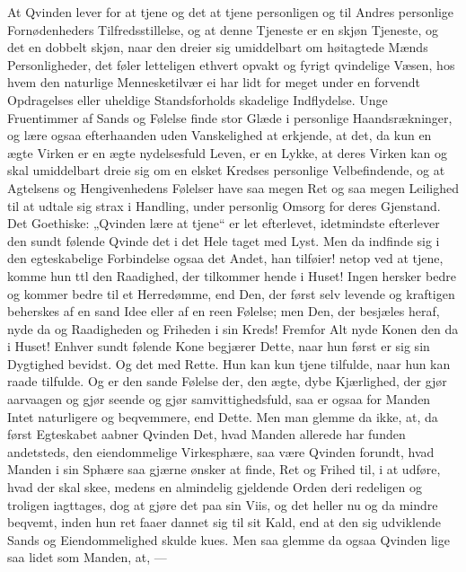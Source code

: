 \documentclass[12pt,a4paper]{book}
\newcommand{\apage}[1]{\marginnote{\footnotesize\textit{[#1]}}}
\begin{document}
At Qvinden lever for at tjene og det at tjene personligen og til Andres
personlige Fornødenheders Tilfredsstillelse, og at denne Tjeneste er en
skjøn Tjeneste, og det en dobbelt skjøn, naar den dreier sig umiddelbart \apage{107}
om høitagtede Mænds Personligheder, det føler letteligen ethvert opvakt
og fyrigt qvindelige Væsen, hos hvem den naturlige Mennesketilvær ei har
lidt for meget under en forvendt Opdragelses eller uheldige
Standsforholds skadelige Indflydelse. Unge Fruentimmer af Sands og
Følelse finde stor Glæde i personlige Haandsrækninger, og lære ogsaa
efterhaanden uden Vanskelighed at erkjende, at det, da kun en ægte
Virken er en ægte nydelsesfuld Leven, er en Lykke, at deres Virken kan
og skal umiddelbart dreie sig om en elsket Kredses personlige
Velbefindende, og at Agtelsens og Hengivenhedens Følelser have saa megen
Ret og saa megen Leilighed til at udtale sig strax i Handling, under
personlig Omsorg for deres Gjenstand. Det Goethiske: „Qvinden lære at
tjene“ er let efterlevet, idetmindste efterlever den sundt følende
Qvinde det i det Hele taget med Lyst. Men da indfinde sig i den
egteskabelige Forbindelse ogsaa det Andet, han tilføier! netop ved at
tjene, komme hun ttl den Raadighed, der tilkommer hende i Huset! Ingen
hersker bedre og kommer bedre til et Herredømme, end Den, der først selv
levende og kraftigen beherskes af en sand Idee eller af en reen Følelse;
men Den, der besjæles heraf, nyde da og Raadigheden og Friheden i sin
Kreds! Fremfor Alt nyde Konen den da i Huset! Enhver sundt følende Kone
begjærer Dette, naar hun først er sig sin Dygtighed bevidst. Og det med
Rette. Hun kan kun tjene tilfulde, naar hun kan raade tilfulde. Og er
den sande Følelse der, \apage{108} den ægte, dybe Kjærlighed, der gjør aarvaagen og
gjør seende og gjør samvittighedsfuld, saa er ogsaa for Manden Intet
naturligere og beqvemmere, end Dette. Men man glemme da ikke, at, da
først Egteskabet aabner Qvinden Det, hvad Manden allerede har funden
andetsteds, den eiendommelige Virkesphære, saa være Qvinden forundt,
hvad Manden i sin Sphære saa gjærne ønsker at finde, Ret og Frihed til,
i at udføre, hvad der skal skee, medens en almindelig gjeldende Orden
deri redeligen og troligen iagttages, dog at gjøre det paa sin Viis, og
det heller nu og da mindre beqvemt, inden hun ret faaer dannet sig til
sit Kald, end at den sig udviklende Sands og Eiendommelighed skulde
kues. Men saa glemme da ogsaa Qvinden lige saa lidet som Manden, at, ---
\end{document}
